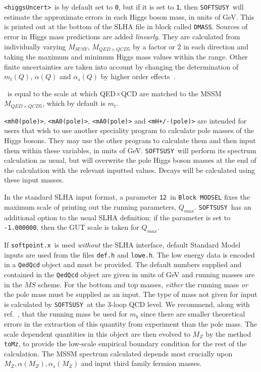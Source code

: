 \documentclass{article}
\def\SOFTSUSY{{\tt SOFTSUSY}}
\def\code#1{\small{\tt #1}\normalsize}
\begin{document}
\code{<higgsUncert>}~is by default set to \code{0}, but if it is set to
\code{1}, then \SOFTSUSY~will estimate the approximate errors in each Higgs
boson mass, in units of GeV. This is printed out at the bottom of the SLHA
file in block called \code{DMASS}. Sources of error in Higgs mass predictions
are added {\em linearly}. They are calculated from individually varying
$M_{SUSY}$, $M_{QED\times QCD5}$ by a
factor or 2 in each direction and taking the maximum and minimum Higgs mass
values within the range. Other finite uncertainties are taken into account by
changing the determination of $m_t(Q)$, $\alpha(Q)$ and $\alpha_s(Q)$ by higher order
effects~\cite{uncert}. 

\code{<mQEDxQCD5>}~is equal to the scale at which QED$\times$QCD are matched to
the MSSM  $M_{QED\times QCD5}$, which by default is $m_t$. 

\code{<mh0(pole)>}, \code{<mA0(pole)>}, \code{<mA0(pole)>} and
\code{<mH+/-(pole)>} are intended for users that wish to use another
speciality program to calculate pole masses of the Higgs bosons. They may use
the other program to calculate them and then input them within these
variables, in units of GeV. \SOFTSUSY{}~will perform its spectrum calculation
as usual, but will overwrite the pole Higgs boson masses at the end of the
calculation with the relevant inputted values. Decays will be calculated using
these input masses. 

In the standard SLHA input format, a parameter 
\code{12}~in \code{Block MODSEL} fixes the maximum scale of printing out the
running parameters, $Q_{max}$. \SOFTSUSY~has an additional option to the usual SLHA
definition: if the parameter is set to \code{-1.000000}, then the GUT scale is
taken for $Q_{max}$.

If \code{softpoint.x}~is used {\em without}\/ the SLHA interface, default
Standard Model inputs are used from the files \code{def.h} and \code{lowe.h}.
The low energy data is encoded in a \code{QedQcd} object and must be
provided. 
The default numbers supplied and contained in the \code{QedQcd} object 
are given in units of
GeV and running masses are in the $\overline{MS}$ scheme. 
For the bottom and
top masses, {\em either}\/ the running mass {\em 
  or}\/ the pole mass must be supplied as an input. The type of mass not given
for input is  calculated
by \SOFTSUSY~at the 3-loop QCD level. We recommend, along with
ref.~\cite{bottomMass}, that the
running mass be used for $m_b$ since there are smaller theoretical errors in
the 
extraction of this quantity from experiment than the pole mass. 
The scale dependent quantities in this object are then evolved to $M_Z$ by 
the method \code{toMz}, to provide the low-scale empirical boundary condition
for the rest of the calculation. The MSSM spectrum calculated depends most
crucially upon $M_Z, \alpha(M_Z), \alpha_s(M_Z)$ and input third family
fermion masses.
\end{document}
